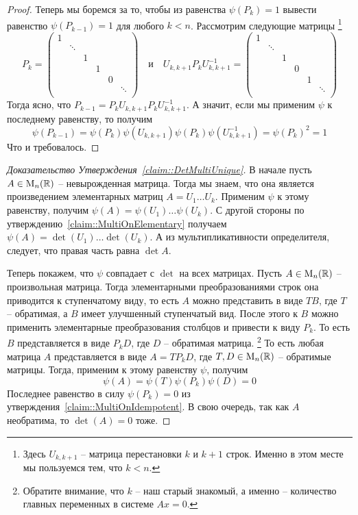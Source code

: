 \begin{proof}
Теперь мы боремся за то, чтобы из равенства $\psi(P_k) = 1$ вывести равенство $\psi(P_{k-1}) = 1$ для любого $k < n$.
Рассмотрим следующие матрицы%
\footnote{Здесь $U_{k, k+1}$ -- матрица перестановки $k$ и $k+1$ строк.
Именно в этом месте мы пользуемся тем, что $k<n$.}
\[
P_k=
\begin{pmatrix}
{1}&{}&{}&{}&{}&{}\\
{}&{\ddots}&{}&{}&{}&{}\\
{}&{}&{1}&{}&{}&{}\\
{}&{}&{}&{1}&{}&{}\\
{}&{}&{}&{}&{0}&{}\\
{}&{}&{}&{}&{}&{\ddots}\\
\end{pmatrix}
\quad\text{и}\quad
U_{k,k+1}P_kU_{k,k+1}^{-1}=
\begin{pmatrix}
{1}&{}&{}&{}&{}&{}\\
{}&{\ddots}&{}&{}&{}&{}\\
{}&{}&{1}&{}&{}&{}\\
{}&{}&{}&{0}&{}&{}\\
{}&{}&{}&{}&{1}&{}\\
{}&{}&{}&{}&{}&{\ddots}\\
\end{pmatrix}
\]
Тогда ясно, что $P_{k-1} = P_k U_{k,k+1}P_k U_{k,k+1}^{-1}$.
А значит, если мы применим $\psi$ к последнему равенству, то получим
\[
\psi(P_{k-1}) = \psi(P_k)\psi(U_{k,k+1})\psi(P_k)\psi(U_{k,k+1}^{-1}) = \psi(P_k)^2 = 1
\]
Что и требовалось.
\end{proof}


\begin{proof}
[Доказательство Утверждения~\ref{claim::DetMultiUnique}]
В начале пусть $A\in\operatorname{M}_{n}(\mathbb R)$ -- невырожденная матрица.
Тогда мы знаем, что она является произведением элементарных матриц $A = U_1\ldots U_k$.
Применим $\psi$ к этому равенству, получим $\psi(A) = \psi(U_1)\ldots \psi(U_k)$.
С другой стороны по утверждению~\ref{claim::MultiOnElementary} получаем $\psi(A) = \det(U_1)\ldots \det(U_k)$.
А из мультипликативности определителя, следует, что правая часть равна $\det A$.

Теперь покажем, что $\psi$ совпадает с $\det$ на всех матрицах.
Пусть $A\in\operatorname{M}_{n}(\mathbb R)$ -- произвольная матрица.
Тогда элементарными преобразованиями строк она приводится к ступенчатому виду, то есть $A$ можно представить в виде $TB$, где $T$ -- обратимая, а $B$ имеет улучшенный ступенчатый вид.
После этого к $B$ можно применить элементарные преобразования столбцов и привести к виду $P_k$.
То есть $B$ представляется в виде $P_k D$, где $D$ -- обратимая матрица.%
\footnote{Обратите внимание, что $k$ -- наш старый знакомый, а именно -- количество главных переменных в системе $Ax = 0$.}
То есть любая матрица $A$ представляется в виде $A = T P_k D$, где $T,D\in\operatorname{M}_{n}(\mathbb R)$ -- обратимые матрицы.
Тогда, применим к этому равенству $\psi$, получим
\[
\psi(A) = \psi(T)\psi(P_k)\psi(D) = 0
\]
Последнее равенство в силу $\psi(P_k) = 0$ из утверждения~\ref{claim::MultiOnIdempotent}.
В свою очередь, так как $A$ необратима, то $\det(A) = 0$ тоже.
\end{proof}

